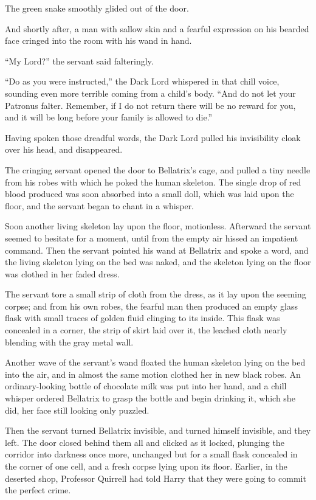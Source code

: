 The green snake smoothly glided out of the door.

And shortly after, a man with sallow skin and a fearful expression on his bearded face cringed into the room with his wand in hand.

“My Lord?” the servant said falteringly.

“Do as you were instructed,” the Dark Lord whispered in that chill voice, sounding even more terrible coming from a child’s body. “And do not let your Patronus falter. Remember, if I do not return there will be no reward for you, and it will be long before your family is allowed to die.”

Having spoken those dreadful words, the Dark Lord pulled his invisibility cloak over his head, and disappeared.

The cringing servant opened the door to Bellatrix’s cage, and pulled a tiny needle from his robes with which he poked the human skeleton. The single drop of red blood produced was soon absorbed into a small doll, which was laid upon the floor, and the servant began to chant in a whisper.

Soon another living skeleton lay upon the floor, motionless. Afterward the servant seemed to hesitate for a moment, until from the empty air hissed an impatient command. Then the servant pointed his wand at Bellatrix and spoke a word, and the living skeleton lying on the bed was naked, and the skeleton lying on the floor was clothed in her faded dress.

The servant tore a small strip of cloth from the dress, as it lay upon the seeming corpse; and from his own robes, the fearful man then produced an empty glass flask with small traces of golden fluid clinging to its inside. This flask was concealed in a corner, the strip of skirt laid over it, the leached cloth nearly blending with the gray metal wall.

Another wave of the servant’s wand floated the human skeleton lying on the bed into the air, and in almost the same motion clothed her in new black robes. An ordinary-looking bottle of chocolate milk was put into her hand, and a chill whisper ordered Bellatrix to grasp the bottle and begin drinking it, which she did, her face still looking only puzzled.

Then the servant turned Bellatrix invisible, and turned himself invisible, and they left. The door closed behind them all and clicked as it locked, plunging the corridor into darkness once more, unchanged but for a small flask concealed in the corner of one cell, and a fresh corpse lying upon its floor.
\sbreak
Earlier, in the deserted shop, Professor Quirrell had told Harry that they were going to commit the perfect crime.

